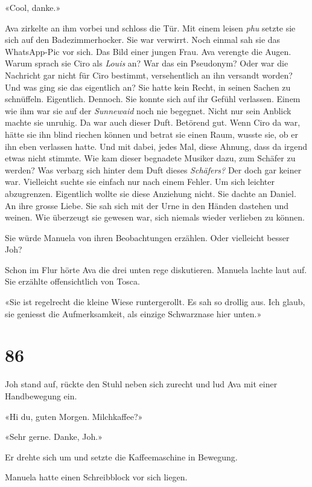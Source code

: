 «Cool, danke.»

Ava zirkelte an ihm vorbei und schloss die Tür. Mit einem leisen
\emph{phu} setzte sie sich auf den Badezimmerhocker. Sie war verwirrt.
Noch einmal sah sie das WhatsApp-Pic vor sich. Das Bild einer jungen
Frau. Ava verengte die Augen. Warum sprach sie Ciro als \emph{Louis} an?
War das ein Pseudonym? Oder war die Nachricht gar nicht für Ciro
bestimmt, versehentlich an ihn versandt worden? Und was ging sie das
eigentlich an? Sie hatte kein Recht, in seinen Sachen zu schnüffeln.
Eigentlich. Dennoch. Sie konnte sich auf ihr Gefühl verlassen. Einem wie
ihm war sie auf der \emph{Sunnewaid} noch nie begegnet. Nicht nur sein
Anblick machte sie unruhig. Da war auch dieser Duft. Betörend gut. Wenn
Ciro da war, hätte sie ihn blind riechen können und betrat sie einen
Raum, wusste sie, ob er ihn eben verlassen hatte. Und mit dabei, jedes
Mal, diese Ahnung, dass da irgend etwas nicht stimmte. Wie kam dieser
begnadete Musiker dazu, zum Schäfer zu werden? Was verbarg sich hinter
dem Duft dieses \emph{Schäfers?} Der doch gar keiner war. Vielleicht
suchte sie einfach nur nach einem Fehler. Um sich leichter abzugrenzen.
Eigentlich wollte sie diese Anziehung nicht. Sie dachte an Daniel. An
ihre grosse Liebe. Sie sah sich mit der Urne in den Händen dastehen und
weinen. Wie überzeugt sie gewesen war, sich niemals wieder verlieben zu
können.

Sie würde Manuela von ihren Beobachtungen erzählen. Oder vielleicht
besser Joh?

Schon im Flur hörte Ava die drei unten rege diskutieren. Manuela lachte
laut auf. Sie erzählte offensichtlich von Tosca.

«Sie ist regelrecht die kleine Wiese runtergerollt. Es sah so drollig
aus. Ich glaub, sie geniesst die Aufmerksamkeit, als einzige Schwarznase
hier unten.»

\chapter{86}\label{section-86}

Joh stand auf, rückte den Stuhl neben sich zurecht und lud Ava mit einer
Handbewegung ein.

«Hi du, guten Morgen. Milchkaffee?»

«Sehr gerne. Danke, Joh.»

Er drehte sich um und setzte die Kaffeemaschine in Bewegung.

Manuela hatte einen Schreibblock vor sich liegen.

